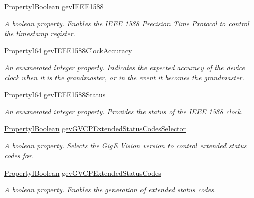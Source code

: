 \begin{DoxyCompactItemize}
\hyperlink{group___common_interface_ga44f9437e24b21b6c93da9039ec6786aa}{Property\+I\+Boolean} \hyperlink{classmv_i_m_p_a_c_t_1_1acquire_1_1_gen_i_cam_1_1_transport_layer_control_a878c1e0692e2aa71b67be94bcb071c64}{gev\+I\+E\+E\+E1588}
\begin{DoxyCompactList}\small\item\em A boolean property. Enables the I\+E\+E\+E 1588 Precision Time Protocol to control the timestamp register. \end{DoxyCompactList}\item 
\hyperlink{group___common_interface_ga81749b2696755513663492664a18a893}{Property\+I64} \hyperlink{classmv_i_m_p_a_c_t_1_1acquire_1_1_gen_i_cam_1_1_transport_layer_control_a29019ba4360e2180931b939b6008d6d4}{gev\+I\+E\+E\+E1588\+Clock\+Accuracy}
\begin{DoxyCompactList}\small\item\em An enumerated integer property. Indicates the expected accuracy of the device clock when it is the grandmaster, or in the event it becomes the grandmaster. \end{DoxyCompactList}\item 
\hyperlink{group___common_interface_ga81749b2696755513663492664a18a893}{Property\+I64} \hyperlink{classmv_i_m_p_a_c_t_1_1acquire_1_1_gen_i_cam_1_1_transport_layer_control_a2fe87e552155f59ea88677aad321dc9b}{gev\+I\+E\+E\+E1588\+Status}
\begin{DoxyCompactList}\small\item\em An enumerated integer property. Provides the status of the I\+E\+E\+E 1588 clock. \end{DoxyCompactList}\item 
\hyperlink{group___common_interface_ga44f9437e24b21b6c93da9039ec6786aa}{Property\+I\+Boolean} \hyperlink{classmv_i_m_p_a_c_t_1_1acquire_1_1_gen_i_cam_1_1_transport_layer_control_a4d89460b444cb1579229c34e9d4c2e0a}{gev\+G\+V\+C\+P\+Extended\+Status\+Codes\+Selector}
\begin{DoxyCompactList}\small\item\em A boolean property. Selects the Gig\+E Vision version to control extended status codes for. \end{DoxyCompactList}\item 
\hyperlink{group___common_interface_ga44f9437e24b21b6c93da9039ec6786aa}{Property\+I\+Boolean} \hyperlink{classmv_i_m_p_a_c_t_1_1acquire_1_1_gen_i_cam_1_1_transport_layer_control_acd44dca38d93bcd521d33b2254f84716}{gev\+G\+V\+C\+P\+Extended\+Status\+Codes}
\begin{DoxyCompactList}\small\item\em A boolean property. Enables the generation of extended status codes. \end{DoxyCompactList}\item 

\end{DoxyCompactItemize}

